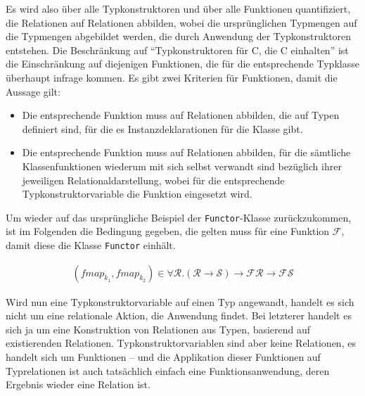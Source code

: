 Es wird also über alle Typkonstruktoren und über alle Funktionen quantifiziert, die Relationen auf Relationen abbilden, wobei die
ursprünglichen Typmengen auf die Typmengen abgebildet werden, die durch Anwendung der Typkonstruktoren entstehen.
Die Beschränkung auf ``Typkonstruktoren für C, die C einhalten'' ist die Einschränkung auf diejenigen Funktionen, die für die
entsprechende Typklasse überhaupt infrage kommen. Es gibt zwei Kriterien für Funktionen, damit die Aussage gilt:

\begin{itemize}
\item Die entsprechende Funktion muss auf Relationen abbilden, die auf Typen definiert sind, für die es Instanzdeklarationen
für die Klasse gibt.
\item Die entsprechende Funktion muss auf Relationen abbilden, für die sämtliche Klassenfunktionen wiederum mit sich selbst
verwandt sind bezüglich ihrer jeweiligen Relationaldarstellung, wobei für die entsprechende Typkonstruktorvariable die Funktion
eingesetzt wird.
\end{itemize}

Um wieder auf das ursprüngliche Beispiel der \texttt{Functor}-Klasse zurückzukommen, ist im Folgenden die Bedingung gegeben,
die gelten muss für eine Funktion $\mathcal{F}$, damit diese die Klasse \texttt{Functor} einhält.

\begin{align*}
(fmap_{k_1}, fmap_{k_2}) \in \forall \mathcal{R} . (\mathcal{R} \rightarrow \mathcal{S}) \rightarrow \mathcal{F} \mathcal{R}
\rightarrow \mathcal{F} \mathcal{S}
\end{align*}


Wird nun eine Typkonstruktorvariable auf einen Typ angewandt, handelt es sich nicht um eine relationale Aktion, die Anwendung findet.
Bei letzterer handelt es sich ja um eine Konstruktion von Relationen aus Typen, basierend auf existierenden Relationen.
Typkonstruktorvariablen sind aber keine Relationen, es handelt sich um Funktionen -- und die Applikation dieser Funktionen auf
Typrelationen ist auch tatsächlich einfach eine Funktionsanwendung, deren Ergebnis wieder eine Relation ist.

